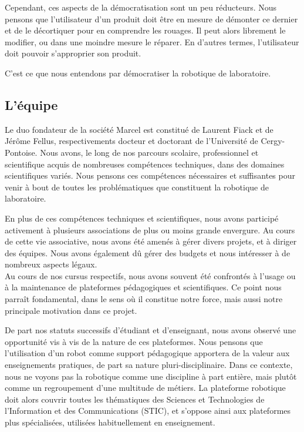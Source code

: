 \documentclass[a4paper,12pt]{report}
\begin{document}
Cependant, ces aspects de la démocratisation sont un peu réducteurs.
Nous pensons que l'utilisateur d'un produit doit être en mesure de démonter ce dernier et de le décortiquer pour en comprendre les rouages.
Il peut alors librement le modifier, ou dans une moindre mesure le réparer.
En d'autres termes, l'utilisateur doit pouvoir s'approprier son produit.

C'est ce que nous entendons par \og{}démocratiser la robotique de laboratoire\fg{}.

\subsection{L'équipe}
Le duo fondateur de la société Marcel est constitué de Laurent Fiack et de Jérôme Fellus, respectivements docteur et doctorant de l'Université de Cergy-Pontoise.
Nous avons, le long de nos parcours scolaire, professionnel et scientifique acquis de nombreuses compétences techniques, dans des domaines scientifiques variés. 
Nous pensons ces compétences nécessaires et suffisantes pour venir à bout de toutes les problématiques que constituent la robotique de laboratoire.

En plus de ces compétences techniques et scientifiques, nous avons participé activement à plusieurs associations de plus ou moins grande envergure.
Au cours de cette vie associative, nous avons été amenés à gérer divers projets, et à diriger des équipes.
Nous avons également dû gérer des budgets et nous intéresser à de nombreux aspects légaux.\\

Au cours de nos cursus respectifs, nous avons souvent été confrontés à l'usage ou à la maintenance de plateformes pédagogiques et scientifiques.
Ce point nous parraît fondamental, dans le sens où il constitue notre force, mais aussi notre principale motivation dans ce projet.

De part nos statuts successifs d'étudiant et d'enseignant, nous avons observé une opportunité vis à vis de la nature de ces plateformes.
Nous pensons que l'utilisation d'un robot comme support pédagogique apportera de la valeur aux enseignements pratiques, de part sa nature pluri-disciplinaire.
Dans ce contexte, nous ne voyons pas la robotique comme une discipline à part entière, mais plutôt comme un regroupement d'une multitude de métiers.
La plateforme robotique doit alors couvrir toutes les thématiques des Sciences et Technologies de l'Information et des Communications (STIC),
et s'oppose ainsi aux plateformes plus spécialisées, utilisées habituellement en enseignement.\\
\end{document}
